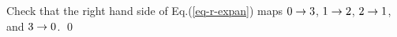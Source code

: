 \claim

\proof
Check that the right hand side
of Eq.(\ref{eq-r-expan})
maps
$0\rightarrow 3$,
$1\rightarrow 2$,
$2\rightarrow 1$, and
$3\rightarrow 0$.
\qed
